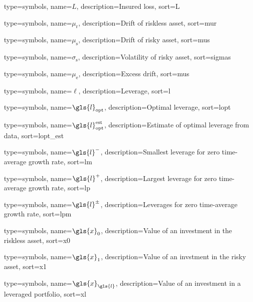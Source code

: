 {
  type={symbols}, 
  name={\ensuremath{L}},
  description={Insured loss},
  sort=L
}


{
  type={symbols}, 
  name={\ensuremath{\mu_\text{r}}},
  description={Drift of riskless asset},
  sort=mur
}

{
  type={symbols}, 
  name={\ensuremath{\mu_\text{s}}},
  description={Drift of risky asset},
  sort=mus
}

{
  type={symbols}, 
  name={\ensuremath{\sigma_\text{s}}},
  description={Volatility of risky asset},
  sort=sigmas
}

{
  type={symbols}, 
  name={\ensuremath{\mu_\text{e}}},
  description={Excess drift},
  sort=mus
}

{
  type={symbols}, 
  name={\ensuremath{\ell}},
  description={Leverage},
  sort=l
}

{
  type={symbols}, 
  name={\ensuremath{\gls{l}_\text{opt}}},
  description={Optimal leverage},
  sort=lopt
}

{
  type={symbols}, 
  name={\ensuremath{\gls{l}_\text{opt}^\text{est}}},
  description={Estimate of optimal leverage from data},
  sort=lopt_est
}

{
  type={symbols}, 
  name={\ensuremath{\gls{l}^{-}}},
  description={Smallest leverage for zero time-average growth rate},
  sort=lm
}

{
  type={symbols}, 
  name={\ensuremath{\gls{l}^{+}}},
  description={Largest leverage for zero time-average growth rate},
  sort=lp
}

{
  type={symbols}, 
  name={\ensuremath{\gls{l}^{\pm}}},
  description={Leverages for zero time-average growth rate},
  sort=lpm
}

{
  type={symbols}, 
  name={\ensuremath{\gls{x}_0}},
  description={Value of an investment in the riskless asset},
  sort=x0
}

{
  type={symbols}, 
  name={\ensuremath{\gls{x}_1}},
  description={Value of an invstment in the risky asset},
  sort=x1
}

{
  type={symbols}, 
  name={\ensuremath{\gls{x}_{\gls{l}}}},
  description={Value of an investment in a leveraged portfolio},
  sort=xl
}

